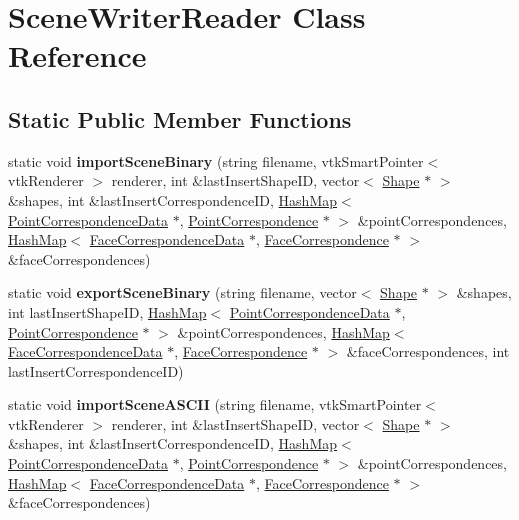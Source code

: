 \hypertarget{class_scene_writer_reader}{}\section{Scene\+Writer\+Reader Class Reference}
\label{class_scene_writer_reader}
\subsection*{Static Public Member Functions}
\begin{DoxyCompactItemize}
\item 
\hypertarget{class_scene_writer_reader_a73c721779d6e77eb47af4699a88b943b}{}static void {\bfseries import\+Scene\+Binary} (string filename, vtk\+Smart\+Pointer$<$ vtk\+Renderer $>$ renderer, int \&last\+Insert\+Shape\+I\+D, vector$<$ \hyperlink{class_shape}{Shape} $\ast$ $>$ \&shapes, int \&last\+Insert\+Correspondence\+I\+D, \hyperlink{class_hash_map}{Hash\+Map}$<$ \hyperlink{class_point_correspondence_data}{Point\+Correspondence\+Data} $\ast$, \hyperlink{class_point_correspondence}{Point\+Correspondence} $\ast$ $>$ \&point\+Correspondences, \hyperlink{class_hash_map}{Hash\+Map}$<$ \hyperlink{class_face_correspondence_data}{Face\+Correspondence\+Data} $\ast$, \hyperlink{class_face_correspondence}{Face\+Correspondence} $\ast$ $>$ \&face\+Correspondences)\label{class_scene_writer_reader_a73c721779d6e77eb47af4699a88b943b}

\item 
\hypertarget{class_scene_writer_reader_a09371c97032114bbb2d639de98bbd0c4}{}static void {\bfseries export\+Scene\+Binary} (string filename, vector$<$ \hyperlink{class_shape}{Shape} $\ast$ $>$ \&shapes, int last\+Insert\+Shape\+I\+D, \hyperlink{class_hash_map}{Hash\+Map}$<$ \hyperlink{class_point_correspondence_data}{Point\+Correspondence\+Data} $\ast$, \hyperlink{class_point_correspondence}{Point\+Correspondence} $\ast$ $>$ \&point\+Correspondences, \hyperlink{class_hash_map}{Hash\+Map}$<$ \hyperlink{class_face_correspondence_data}{Face\+Correspondence\+Data} $\ast$, \hyperlink{class_face_correspondence}{Face\+Correspondence} $\ast$ $>$ \&face\+Correspondences, int last\+Insert\+Correspondence\+I\+D)\label{class_scene_writer_reader_a09371c97032114bbb2d639de98bbd0c4}

\item 
\hypertarget{class_scene_writer_reader_a12ad397c3807354da56b1c5c9a985e47}{}static void {\bfseries import\+Scene\+A\+S\+C\+I\+I} (string filename, vtk\+Smart\+Pointer$<$ vtk\+Renderer $>$ renderer, int \&last\+Insert\+Shape\+I\+D, vector$<$ \hyperlink{class_shape}{Shape} $\ast$ $>$ \&shapes, int \&last\+Insert\+Correspondence\+I\+D, \hyperlink{class_hash_map}{Hash\+Map}$<$ \hyperlink{class_point_correspondence_data}{Point\+Correspondence\+Data} $\ast$, \hyperlink{class_point_correspondence}{Point\+Correspondence} $\ast$ $>$ \&point\+Correspondences, \hyperlink{class_hash_map}{Hash\+Map}$<$ \hyperlink{class_face_correspondence_data}{Face\+Correspondence\+Data} $\ast$, \hyperlink{class_face_correspondence}{Face\+Correspondence} $\ast$ $>$ \&face\+Correspondences)\label{class_scene_writer_reader_a12ad397c3807354da56b1c5c9a985e47}


\end{DoxyCompactItemize}
